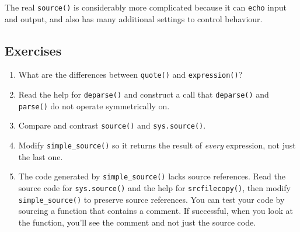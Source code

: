 \begin{Shaded}
\begin{Highlighting}[]
\StringTok{ } \NormalTok{()) \{}
  \NormalTok{(}
  \NormalTok{(}

  \StringTok{ } \NormalTok{)}
  \StringTok{ }\NormalTok{(} 

  \StringTok{ }
  \StringTok{ }\NormalTok{(}\NormalTok{())}

  \StringTok{ }\NormalTok{)) \{}
  \NormalTok{\}}
  \NormalTok{(}
\NormalTok{\}}
\end{Highlighting}
\end{Shaded}

The real \texttt{source()} is considerably more complicated because it
can \texttt{echo} input and output, and also has many additional
settings to control behaviour.

\subsection{Exercises}

\begin{enumerate}
\def\labelenumi{\arabic{enumi}.}
\item
  What are the differences between \texttt{quote()} and
  \texttt{expression()}?
\item
  Read the help for \texttt{deparse()} and construct a call that
  \texttt{deparse()} and \texttt{parse()} do not operate symmetrically
  on.
\item
  Compare and contrast \texttt{source()} and \texttt{sys.source()}.
\item
  Modify \texttt{simple\_source()} so it returns the result of
  \emph{every} expression, not just the last one.
\item
  The code generated by \texttt{simple\_source()} lacks source
  references. Read the source code for \texttt{sys.source()} and the
  help for \texttt{srcfilecopy()}, then modify \texttt{simple\_source()}
  to preserve source references. You can test your code by sourcing a
  function that contains a comment. If successful, when you look at the
  function, you'll see the comment and not just the source code.
\end{enumerate}

